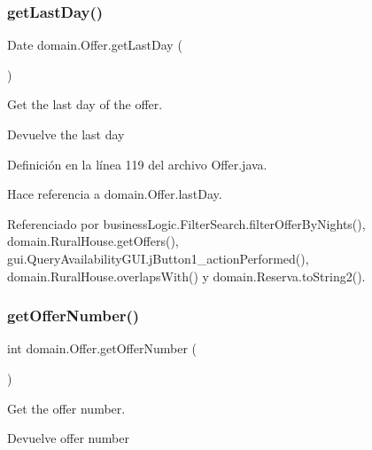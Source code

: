 \subsubsection{\texorpdfstring{getLastDay()}{getLastDay()}}
{\footnotesize\ttfamily Date domain.\+Offer.\+get\+Last\+Day (\begin{DoxyParamCaption}{ }\end{DoxyParamCaption})}



Get the last day of the offer. 

\begin{DoxyReturn}{Devuelve}
the last day 
\end{DoxyReturn}


Definición en la línea 119 del archivo Offer.\+java.


\begin{DoxyCode}{0}

\end{DoxyCode}


Hace referencia a domain.\+Offer.\+last\+Day.



Referenciado por business\+Logic.\+Filter\+Search.\+filter\+Offer\+By\+Nights(), domain.\+Rural\+House.\+get\+Offers(), gui.\+Query\+Availability\+G\+U\+I.\+j\+Button1\+\_\+action\+Performed(), domain.\+Rural\+House.\+overlaps\+With() y domain.\+Reserva.\+to\+String2().

\mbox{\label{classdomain_1_1_offer_ab9e27c474ec6819a27eac1847d876c3a}} 
\subsubsection{\texorpdfstring{getOfferNumber()}{getOfferNumber()}}
{\footnotesize\ttfamily int domain.\+Offer.\+get\+Offer\+Number (\begin{DoxyParamCaption}{ }\end{DoxyParamCaption})}



Get the offer number. 

\begin{DoxyReturn}{Devuelve}
offer number 
\end{DoxyReturn}



